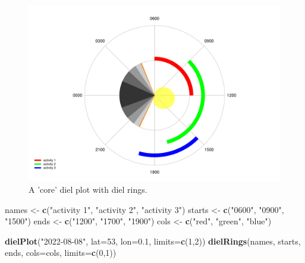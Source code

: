 \documentclass[
]{book}
\newenvironment{Shaded}{\begin{snugshade}}{\end{snugshade}}
\newcommand{\AttributeTok}[1]{\textcolor[rgb]{0.13,0.29,0.53}{#1}}
\newcommand{\DecValTok}[1]{\textcolor[rgb]{0.00,0.00,0.81}{#1}}
\newcommand{\FloatTok}[1]{\textcolor[rgb]{0.00,0.00,0.81}{#1}}
\newcommand{\FunctionTok}[1]{\textcolor[rgb]{0.13,0.29,0.53}{\textbf{#1}}}
\newcommand{\NormalTok}[1]{#1}
\newcommand{\OtherTok}[1]{\textcolor[rgb]{0.56,0.35,0.01}{#1}}
\newcommand{\StringTok}[1]{\textcolor[rgb]{0.31,0.60,0.02}{#1}}
\begin{document}
\begin{figure}

{\centering \includegraphics[width=0.9\linewidth]{_main_files/figure-latex/diel-plot-rings-1-1} 

}

\caption{A 'core' diel plot with diel rings.}\label{fig:diel-plot-rings-1}
\end{figure}

\begin{Shaded}
\begin{Highlighting}[]
\NormalTok{names }\OtherTok{\textless{}{-}} \FunctionTok{c}\NormalTok{(}\StringTok{"activity 1"}\NormalTok{, }\StringTok{"activity 2"}\NormalTok{, }\StringTok{"activity 3"}\NormalTok{)}
\NormalTok{starts }\OtherTok{\textless{}{-}} \FunctionTok{c}\NormalTok{(}\StringTok{"0600"}\NormalTok{, }\StringTok{"0900"}\NormalTok{, }\StringTok{"1500"}\NormalTok{)}
\NormalTok{ends }\OtherTok{\textless{}{-}} \FunctionTok{c}\NormalTok{(}\StringTok{"1200"}\NormalTok{, }\StringTok{"1700"}\NormalTok{, }\StringTok{"1900"}\NormalTok{)}
\NormalTok{cols }\OtherTok{\textless{}{-}} \FunctionTok{c}\NormalTok{(}\StringTok{"red"}\NormalTok{, }\StringTok{"green"}\NormalTok{, }\StringTok{"blue"}\NormalTok{)}

\FunctionTok{dielPlot}\NormalTok{(}\StringTok{"2022{-}08{-}08"}\NormalTok{, }\AttributeTok{lat=}\DecValTok{53}\NormalTok{, }\AttributeTok{lon=}\FloatTok{0.1}\NormalTok{, }\AttributeTok{limits=}\FunctionTok{c}\NormalTok{(}\DecValTok{1}\NormalTok{,}\DecValTok{2}\NormalTok{))}
\FunctionTok{dielRings}\NormalTok{(names, starts, ends, }\AttributeTok{cols=}\NormalTok{cols, }\AttributeTok{limits=}\FunctionTok{c}\NormalTok{(}\DecValTok{0}\NormalTok{,}\DecValTok{1}\NormalTok{))}
\end{Highlighting}
\end{Shaded}
\end{document}
